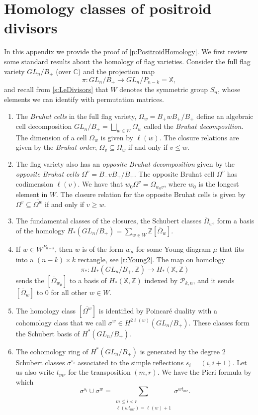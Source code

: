 \documentclass{amsart}
\theoremstyle{definition}
\numberwithin{equation}{section}
\newcommand{\C}{\mathbb{C}}
\newcommand{\Z}{\mathbb{Z}}
\begin{document}
\section{Homology classes of positroid divisors}\label{a:positroidhomology}


In this appendix we provide the proof of \cref{p:PositroidHomology}. 
We first review
some standard results about the homology of flag varieties. 
Consider 
the full flag variety  $GL_{n}/B_+$ (over $\C$) and the projection map 
\[
\pi:GL_{n}/B_+\to  GL_n/P_{n-k}=\mathbb X,
\]
and recall from \cref{s:LeDivisors}
that $W$ denotes the symmetric group $S_{n}$, 
whose elements we can identify with permutation matrices. 
\begin{enumerate}
	\item The \textit{Bruhat cells} in the full flag variety, $\Omega_w=B_+w B_+/B_+$ define an algebraic cell decomposition $GL_n/B_+=\bigsqcup_{w\in W}\Omega_w$ called the \emph{Bruhat decomposition}. The dimension of a cell $\Omega_w$ is given by $\ell(w)$. The closure relations are given by the \emph{Bruhat order}, $\Omega_v\subseteq\overline{\Omega_w}$ if and only if $v\le w$.  
	\item The flag variety also has an \emph{opposite Bruhat decomposition} given by the \textit{opposite Bruhat cells} $\Omega^v=B_-v B_+/B_+$.  The opposite Bruhat cell $\Omega^v$ has codimension $\ell(v)$. We have that $w_0\Omega^{v}=\Omega_{w_0v}$, where $w_0$ is the longest element in $W$. The closure relation for the opposite Bruhat cells is  given by $\Omega^v\subseteq\overline{\Omega^w}$ if and only if $v\ge w$.  
  \item The fundamental classes of the closures, the Schubert classes $\overline{\Omega}_w$,  form a basis of the homology $H_*(GL_n/B_+)=\sum_{w\in W}\Z[\overline {\Omega}_w]$.
\item If $w\in W^{P_{n-k}}$, then $w$ is of the form $w_\mu$ for some Young diagram $\mu$ that fits into a $(n-k)\times k$ rectangle, see \cref{r:Young2}. The map on homology 
\[
\pi_*: H_*(GL_{n}/B_+,\Z)\to  H_*(\mathbb X,\Z)
\]
sends the $[\overline{\Omega}_{w_\mu}]$ to a basis of $H_*(\mathbb X,\Z)$ indexed by $\mathcal P_{k,n}$, and it sends $[\overline{\Omega}_{w}]$ to $0$ for all other $w\in W$.
\item The homology class $[\overline{\Omega^{w}}]$ is  identified by Poincar\'e duality with a cohomology class that we call $\sigma^{w}\in H^{2\ell(w)}(GL_n/B_+)$. These classes form the Schubert basis of $H^*(GL_n/B_+)$.
\item The cohomology ring of $H^*(GL_n/B_+)$ is generated by the degree $2$ Schubert classes $\sigma^{s_i}$ associated to the simple reflections $s_i=(i, i+1)$. Let us also write $t_{mr}$ for the transposition $(m,r)$. We have the Pieri formula by which
\begin{equation}\label{e:Pieri}
\sigma^{s_i}\cup \sigma^w=\sum_{\substack{ m\le i<r\\ \ell(wt_{mr})=\ell(w)+1 }}\sigma^{wt_{mr}}.
\end{equation}
\end{enumerate}
\end{document}
